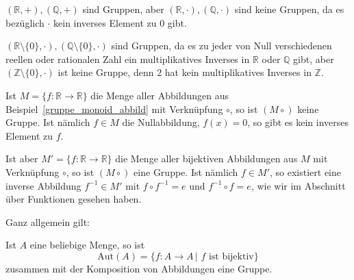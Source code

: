 \begin{beispiel} $(\mathbb R, +), (\mathbb Q, +)$ sind Gruppen, aber $(\mathbb R, \cdot), 
(\mathbb Q, \cdot)$ sind keine Gruppen, da es bezüglich $\cdot$ kein inverses Element zu $0$ gibt.

$(\mathbb R \setminus \{0\}, \cdot), (\mathbb Q  \setminus \{0\}, \cdot)$ sind Gruppen, da es zu 
jeder von Null verschiedenen reellen oder rationalen Zahl ein multiplikatives Inverses in $\mathbb R$ 
oder $\mathbb Q$ gibt, aber $(\mathbb Z \setminus \{0\}, \cdot)$ ist keine Gruppe, denn $2$ hat kein 
multiplikatives Inverses in $\mathbb Z$.
\end{beispiel}

\begin{beispiel} 
Ist $M = \{f: \mathbb R \longrightarrow \mathbb R \}$ die Menge aller Abbildungen aus 
Beispiel~\ref{gruppe_monoid_abbild} mit Verknüpfung $\circ$, so ist $(M \circ)$ keine Gruppe. Ist 
nämlich $f \in M$ die Nullabbildung, $f(x) = 0$, so gibt es kein inverses Element zu $f$.

Ist aber $M' = \{f: \mathbb R \longrightarrow \mathbb R \}$ die Menge aller bijektiven Abbildungen aus 
$M$ mit Verknüpfung $\circ$, so ist $(M \circ)$ eine Gruppe. Ist 
nämlich $f \in M'$, so existiert eine inverse Abbildung $f^{-1} \in M'$ mit $f \circ f^{-1} = e$ und 
$f^{-1} \circ f = e$, wie wir im Abschnitt über Funktionen gesehen haben.

Ganz allgemein gilt: 

Ist $A$ eine beliebige Menge, so ist 
	$$ \mathrm{Aut}(A) = \{ f: A \longrightarrow A \, \vert \,\, f \text{ ist bijektiv} \} $$
zusammen mit der Komposition von Abbildungen eine Gruppe. 
\end{beispiel}

